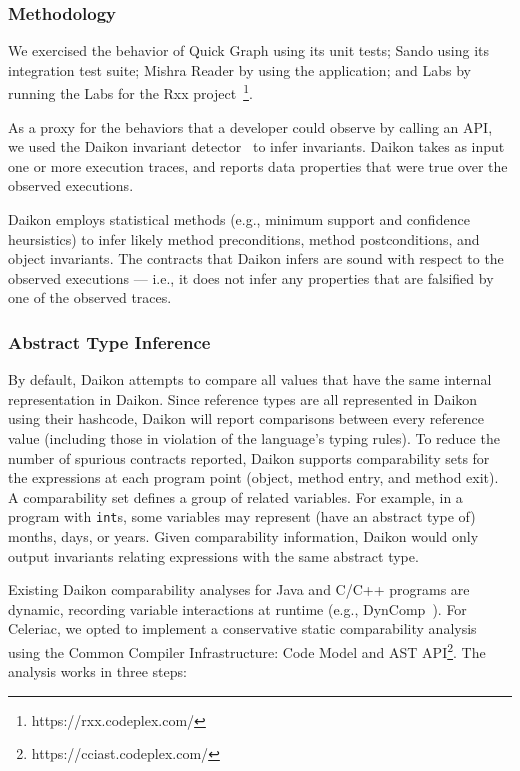 \subsubsection{Methodology}

We exercised the behavior of Quick Graph using its unit tests; Sando
using its integration test suite; Mishra Reader by using the
application; and Labs by running the Labs for the Rxx
project~\footnote{https://rxx.codeplex.com/}.

As a proxy for the behaviors that a developer could observe by calling
an API, we used the Daikon invariant detector~\cite{daikon}
to infer invariants. Daikon takes as input one or more execution
traces, and reports data properties that were true over the observed
executions.

Daikon employs statistical methods (e.g., minimum support and
confidence heursistics) to infer likely method preconditions, method
postconditions, and object invariants.
%
The contracts that Daikon infers are sound with respect to the
observed executions --- i.e., it does not infer any properties that
are falsified by one of the observed traces.
%

\subsubsection{Abstract Type Inference}
\label{sec:comparability}

By default, Daikon attempts to compare all values that have the same
internal representation in Daikon. Since reference types are all
represented in Daikon using their hashcode, Daikon will report
comparisons between every reference value (including those in
violation of the language's typing rules).
%
To reduce the number of spurious contracts reported, Daikon supports
comparability sets for the expressions at each program point (object,
method entry, and method exit).
%
A comparability set defines a group of related variables. For example,
in a program with \verb|int|s, some variables may represent (have an
abstract type of) months, days, or years. Given comparability
information, Daikon would only output invariants relating expressions
with the same abstract type.

Existing Daikon comparability analyses for Java and C/C++ programs are
dynamic, recording variable interactions at runtime
(e.g., DynComp~). For Celeriac, we opted to implement a
conservative static comparability analysis using the Common Compiler
Infrastructure: Code Model and AST
API\footnote{https://cciast.codeplex.com/}. The analysis works in
three steps:

